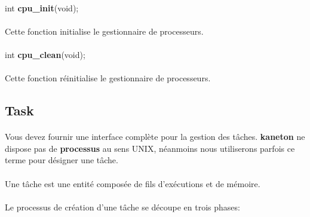 \documentclass[10pt,a4wide]{article}
\begin{document}
\paragraph{}

\hspace{1.5cm}int \textbf{cpu\_init}(void);

\paragraph{}

Cette fonction initialise le gestionnaire de processeurs.

\paragraph{}

\hspace{1.5cm}int \textbf{cpu\_clean}(void);

\paragraph{}

Cette fonction r\'einitialise le gestionnaire de processeurs.

\subsection{Task}

\paragraph{}

Vous devez fournir une interface compl\`ete pour la gestion des t\^aches.
\textbf{kaneton} ne dispose pas de \textbf{processus} au sens UNIX, n\'eanmoins
nous utiliserons parfois ce terme pour d\'esigner une t\^ache.

\paragraph{}

Une t\^ache est une entit\'e compos\'ee de fils d'ex\'ecutions et de
m\'emoire.

\paragraph{}

Le processus de cr\'eation d'une t\^ache se d\'ecoupe en trois phases:
\end{document}
